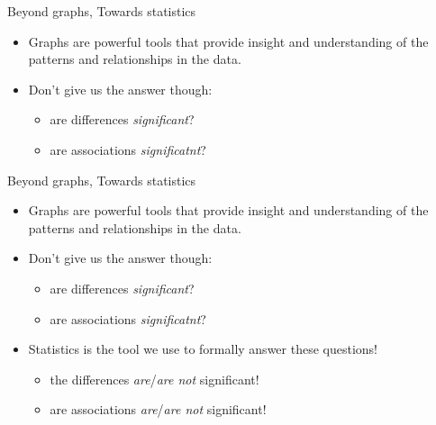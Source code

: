 \documentclass[ignorenonframetext,t]{beamer}
\providecommand{\tightlist}{%
  \setlength{\itemsep}{0pt}\setlength{\parskip}{0pt}}
\begin{document}
\begin{frame}{Beyond graphs, Towards statistics}

\begin{itemize}
\item
  Graphs are powerful tools that provide insight and understanding of
  the patterns and relationships in the data.
\item
  Don't give us the answer though:

  \begin{itemize}
  \tightlist
  \item
    are differences \emph{significant}?
  \item
    are associations \emph{significatnt}?
  \end{itemize}
\end{itemize}


\end{frame}

\begin{frame}{Beyond graphs, Towards statistics}

\begin{itemize}
\item
  Graphs are powerful tools that provide insight and understanding of
  the patterns and relationships in the data.
\item
  Don't give us the answer though:

  \begin{itemize}
  \tightlist
  \item
    are differences \emph{significant}?
  \item
    are associations \emph{significatnt}?
  \end{itemize}
\item
  Statistics is the tool we use to formally answer these questions!

  \begin{itemize}
  \tightlist
  \item
    the differences \emph{are}/\emph{are not} significant!
  \item
    are associations \emph{are}/\emph{are not} significant!
  \end{itemize}
\end{itemize}

\end{frame}
\end{document}
